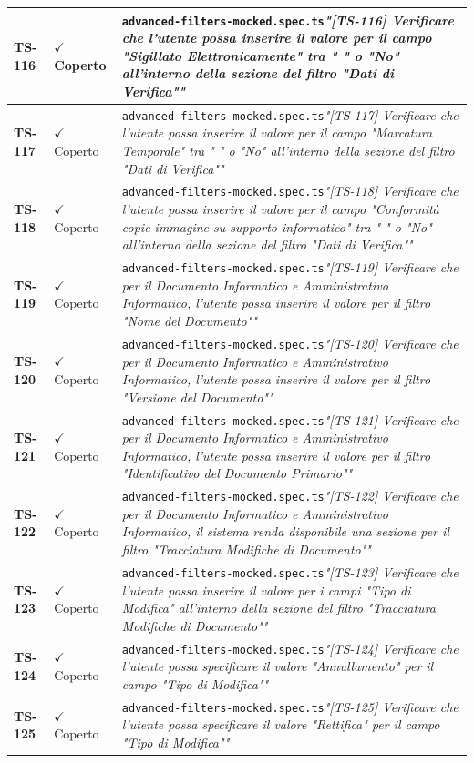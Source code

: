 \documentclass[a4paper,12pt]{article}
\newcommand{\ok}{\textcolor{green!60!black}{$\checkmark$ Coperto}}
\newcommand{\f}[1]{\nolinkurl{#1}\newline}
\newcommand{\q}[1]{\textit{#1}}
\begin{document}
\begin{longtable}{|p{1.5cm}|p{3.0cm}|p{10.5cm}|}
\textbf{TS-116} & \ok & \f{advanced-filters-mocked.spec.ts}\q{"[TS-116] Verificare che l'utente possa inserire il valore per il campo "Sigillato Elettronicamente" tra " " o "No" all'interno della sezione del filtro "Dati di Verifica""} \\ \hline
\textbf{TS-117} & \ok & \f{advanced-filters-mocked.spec.ts}\q{"[TS-117] Verificare che l'utente possa inserire il valore per il campo "Marcatura Temporale" tra " " o "No" all'interno della sezione del filtro "Dati di Verifica""} \\ \hline
\textbf{TS-118} & \ok & \f{advanced-filters-mocked.spec.ts}\q{"[TS-118] Verificare che l'utente possa inserire il valore per il campo "Conformità copie immagine su supporto informatico" tra " " o "No" all'interno della sezione del filtro "Dati di Verifica""} \\ \hline
\textbf{TS-119} & \ok & \f{advanced-filters-mocked.spec.ts}\q{"[TS-119] Verificare che per il Documento Informatico e Amministrativo Informatico, l'utente possa inserire il valore per il filtro "Nome del Documento""} \\ \hline
\textbf{TS-120} & \ok & \f{advanced-filters-mocked.spec.ts}\q{"[TS-120] Verificare che per il Documento Informatico e Amministrativo Informatico, l'utente possa inserire il valore per il filtro "Versione del Documento""} \\ \hline
\textbf{TS-121} & \ok & \f{advanced-filters-mocked.spec.ts}\q{"[TS-121] Verificare che per il Documento Informatico e Amministrativo Informatico, l'utente possa inserire il valore per il filtro "Identificativo del Documento Primario""} \\ \hline
\textbf{TS-122} & \ok & \f{advanced-filters-mocked.spec.ts}\q{"[TS-122] Verificare che per il Documento Informatico e Amministrativo Informatico, il sistema renda disponibile una sezione per il filtro "Tracciatura Modifiche di Documento""} \\ \hline
\textbf{TS-123} & \ok & \f{advanced-filters-mocked.spec.ts}\q{"[TS-123] Verificare che l'utente possa inserire il valore per i campi "Tipo di Modifica" all'interno della sezione del filtro "Tracciatura Modifiche di Documento""} \\ \hline
\textbf{TS-124} & \ok & \f{advanced-filters-mocked.spec.ts}\q{"[TS-124] Verificare che l'utente possa specificare il valore "Annullamento" per il campo "Tipo di Modifica""} \\ \hline
\textbf{TS-125} & \ok & \f{advanced-filters-mocked.spec.ts}\q{"[TS-125] Verificare che l'utente possa specificare il valore "Rettifica" per il campo "Tipo di Modifica""} \\ \hline

\end{longtable}
\end{document}
